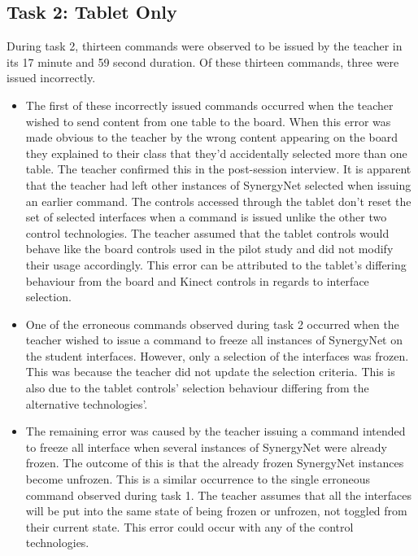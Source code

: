 \documentclass[link]{IWCOMP}
\begin{document}
\subsection{Task 2: Tablet Only}
\label{subsec:resultsTask2}

During task 2, thirteen commands were observed to be issued by the teacher in its 17 minute and 59 second duration.
Of these thirteen commands, three were issued incorrectly.

\begin{itemize}
\item The first of these incorrectly issued commands occurred when the teacher wished to send content from one table to the board.
When this error was made obvious to the teacher by the wrong content appearing on the board they explained to their class that they'd accidentally selected more than one table.
The teacher confirmed this in the post-session interview.
It is apparent that the teacher had left other instances of SynergyNet selected when issuing an earlier command.
The controls accessed through the tablet don't reset the set of selected interfaces when a command is issued unlike the other two control technologies.
The teacher assumed that the tablet controls would behave like the board controls used in the pilot study and did not modify their usage accordingly.
This error can be attributed to the tablet's differing behaviour from the board and Kinect controls in regards to interface selection.

\item One of the erroneous commands observed during task 2 occurred when the teacher wished to issue a command to freeze all instances of SynergyNet on the student interfaces.
However, only a selection of the interfaces was frozen.
This was because the teacher did not update the selection criteria.
This is also due to the tablet controls' selection behaviour differing from the alternative technologies'.

\item The remaining error was caused by the teacher issuing a command intended to freeze all interface when several instances of SynergyNet were already frozen.
The outcome of this is that the already frozen SynergyNet instances become unfrozen.
This is a similar occurrence to the single erroneous command observed during task 1.
The teacher assumes that all the interfaces will be put into the same state of being frozen or unfrozen, not toggled from their current state.
This error could occur with any of the control technologies.
\end{itemize}
\end{document}
